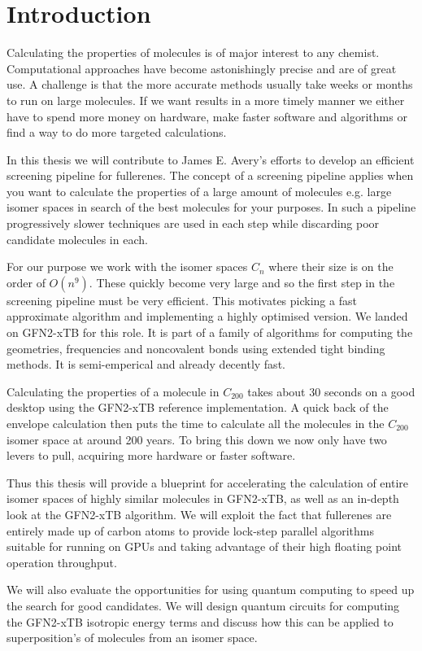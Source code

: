 \chapter{Introduction}
Calculating the properties of molecules is of major interest to any chemist. Computational approaches have become astonishingly precise and are of great use. A challenge is that the more accurate methods usually take weeks or months to run on large molecules. If we want results in a more timely manner we either have to spend more money on hardware, make faster software and algorithms or find a way to do more targeted calculations. 

In this thesis we will contribute to James E. Avery's efforts to develop an efficient screening pipeline for fullerenes. The concept of a screening pipeline applies when you want to calculate the properties of a large amount of molecules e.g. large isomer spaces in search of the best molecules for your purposes. In such a pipeline progressively slower techniques are used in each step while discarding poor candidate molecules in each. 

For our purpose we work with the isomer spaces $C_n$ where their size is on the order of $O(n^9)$.
These quickly become very large and so the first step in the screening pipeline must be very efficient. This motivates picking a fast approximate algorithm and implementing a highly optimised version.
We landed on GFN2-xTB for this role. It is part of a family of algorithms for computing the geometries, frequencies and noncovalent bonds using extended tight binding methods. It is semi-emperical and already decently fast. 

Calculating the properties of a molecule in $C_200$ takes about 30 seconds on a good desktop using the GFN2-xTB reference implementation. A quick back of the envelope calculation then puts the time to calculate all the molecules in the $C_200$ isomer space at around 200 years. To bring this down we now only have two levers to pull, acquiring more hardware or faster software. 

Thus this thesis will provide a blueprint for accelerating the calculation of entire isomer spaces of highly similar molecules in GFN2-xTB, as well as an in-depth look at the GFN2-xTB algorithm. We will exploit the fact that fullerenes are entirely made up of carbon atoms to provide lock-step parallel algorithms suitable for running on GPUs and taking advantage of their high floating point operation throughput.

We will also evaluate the opportunities for using quantum computing to speed up the search for good candidates. We will design quantum circuits for computing the GFN2-xTB isotropic energy terms and discuss how this can be applied to superposition's of molecules from an isomer space. 
